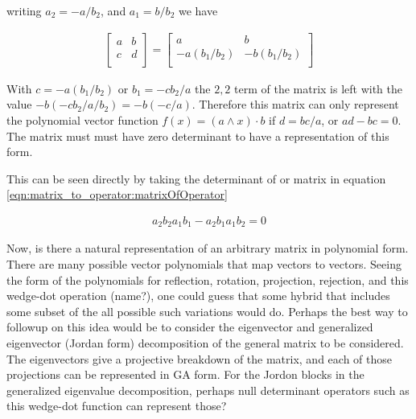 writing $a_2 = -a/b_2$, and $a_1 = b/b_2$ we have

\begin{align*}
\begin{bmatrix}
a & b \\
c & d \\
\end{bmatrix}
=
\begin{bmatrix}
a & b \\
-a (b_1/b_2) & -b (b_1/b_2) \\
\end{bmatrix}
\end{align*}

With $c = -a(b_1/b_2)$ or $b_1 = -c b_2 /a$ the $2,2$ term of the matrix
is left with the value $-b (-c b_2 /a / b_2 ) = -b (-c /a )$.  Therefore 
this matrix can only represent the
polynomial vector function $f(x) = (a \wedge x) \cdot b$ if 
$d = bc/a$, or $ad - bc = 0$.  The matrix must must have zero determinant
to have a representation of this form.

This can be seen directly by taking the determinant of 
or matrix in equation \ref{eqn:matrix_to_operator:matrixOfOperator}

\begin{align*}
a_2 b_2 a_1 b_1 - a_2 b_1 a_1 b_2 = 0
\end{align*}

Now, is there a natural representation of an arbitrary matrix in polynomial form.  There are many possible
vector polynomials that map vectors to vectors.  Seeing the form of the polynomials for reflection, rotation, projection, rejection, and this wedge-dot operation (name?), one could guess that some hybrid that includes some subset of the 
all possible such variations would do.  Perhaps the best way to followup on this idea would be to consider the eigenvector and generalized eigenvector (Jordan form) decomposition of the general matrix to be considered.  The eigenvectors give a projective breakdown of the matrix, and each of those projections can be represented in GA form.  For the Jordon blocks in the generalized eigenvalue decomposition, perhaps null determinant operators such as this wedge-dot function can represent those?

%
%

%
